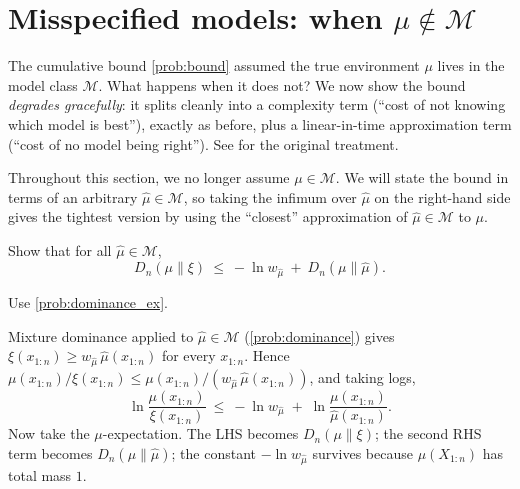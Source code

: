 \documentclass[fontsize=11pt, parskip=half]{scrartcl}
\newcommand{\Mc}{\mathcal{M}}
\begin{document}
\section{Misspecified models: when $\mu \notin \Mc$}\label{prob:misspec}

The cumulative bound \cref{prob:bound} assumed the true environment $\mu$ lives
in the model class $\Mc$. What happens when it does not? We now show the
bound \emph{degrades gracefully}: it splits cleanly into a complexity term
(``cost of not knowing which model is best''), exactly as before, plus a
linear-in-time approximation term (``cost of no model being right''). See \cite[\S3.2.8]{Hutter:04uaibook} for the original treatment.

Throughout this section, we no longer assume $\mu \in \Mc$. 
We will state the bound in terms of an arbitrary
$\hat\mu \in \Mc$, so taking the infimum over $\hat\mu$ on the
right-hand side gives the tightest version by using the ``closest''
approximation of $\hat{\mu} \in \Mc$ to $\mu$.
\begin{exercise}
\label{prob:misspec_ex}



Show that for all $\hat\mu \in \Mc$,
\[
  D_n(\mu \parallel \xi) ~\leq~ -\ln w_{\hat\mu} ~+~ D_n(\mu \parallel \hat\mu).
\]

\begin{hint}
Use \cref{prob:dominance_ex}.
\end{hint}
\end{exercise}

\begin{solution}
Mixture dominance applied to $\hat\mu \in \Mc$ (\cref{prob:dominance}) gives
$\xi(x_{1:n}) \geq w_{\hat\mu}\, \hat\mu(x_{1:n})$ for every $x_{1:n}$. Hence
$\mu(x_{1:n}) / \xi(x_{1:n}) \leq \mu(x_{1:n}) / (w_{\hat\mu}\, \hat\mu(x_{1:n}))$, and taking logs,
\[
  \ln \frac{\mu(x_{1:n})}{\xi(x_{1:n})}
  ~\leq~ -\ln w_{\hat\mu} \;+\; \ln \frac{\mu(x_{1:n})}{\hat\mu(x_{1:n})}.
\]
Now take the $\mu$-expectation. The LHS becomes $D_n(\mu \parallel \xi)$; the second RHS term becomes $D_n(\mu \parallel \hat\mu)$; the constant $-\ln w_{\hat\mu}$ survives because $\mu(X_{1:n})$ has total mass $1$. \qedhere
\end{solution}
\end{document}
